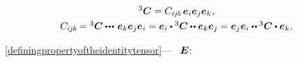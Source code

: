 \nopagebreak\begin{equation}\label{polyada:3}
\begin{array}{c}
{^3\!\,\bm{C}} = C_{i\hspace{-0.1ex}j\hspace{-0.1ex}k} \hspace{.2ex} \bm{e}_i \bm{e}_j \bm{e}_k \hspace{.1ex},
\\[.8ex]
C_{i\hspace{-0.1ex}j\hspace{-0.1ex}k} \hspace{-0.2ex} = {^3\!\,\bm{C}} \dotdotdotp \bm{e}_k \bm{e}_j \bm{e}_i = \bm{e}_i \dotp {^3\!\,\bm{C}} \dotdotp \bm{e}_k \bm{e}_j = \bm{e}_j \bm{e}_i \dotdotp {^3\!\,\bm{C}} \dotp \bm{e}_k \hspace{.1ex}.
\end{array}
\end{equation}

~\eqref{definingpropertyoftheidentitytensor}\:---
~$\bm{E}$\::

